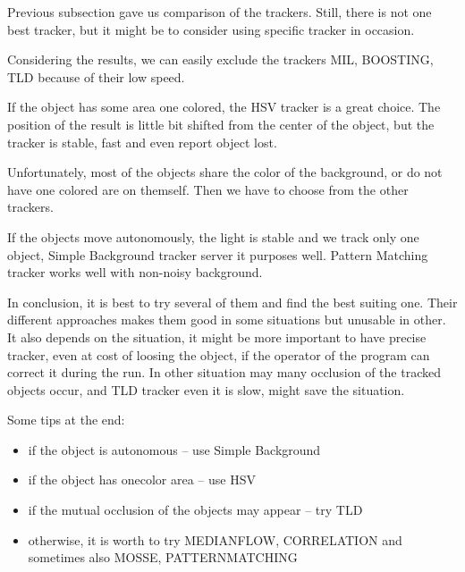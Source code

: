 Previous subsection gave us comparison of the trackers. Still, there is not one
best tracker, but it might be to consider using specific tracker in occasion.

Considering the results, we can easily exclude the trackers MIL, BOOSTING, TLD
because of their low speed. 

If the object has some area one colored, the HSV tracker is a great choice. The
position of the result is little bit shifted from the center of the object, but
the tracker is stable, fast and even report object lost.

Unfortunately, most of the objects share the color of the background, or do not
have one colored are on themself. Then we have to choose from the other
trackers.

If the objects move autonomously, the light is stable and we track only one
object, Simple Background tracker server it purposes well. Pattern Matching
tracker works well with non-noisy background.

In conclusion, it is best to try several of them and find the best suiting one.
Their different approaches makes them good in some situations but unusable in
other. It also depends on the situation, it might be more important to have
precise tracker, even at cost of loosing the object, if the operator of the
program can correct it during the run. In other situation may many occlusion of
the tracked objects occur, and TLD tracker even it is slow, might save the
situation.

Some tips at the end:
\begin{itemize}
\item if the object is autonomous -- use Simple Background
\item if the object has onecolor area -- use HSV
\item if the mutual occlusion of the objects may appear -- try TLD
\item otherwise, it is worth to try MEDIANFLOW, CORRELATION and sometimes also MOSSE, PATTERNMATCHING
\end{itemize}
